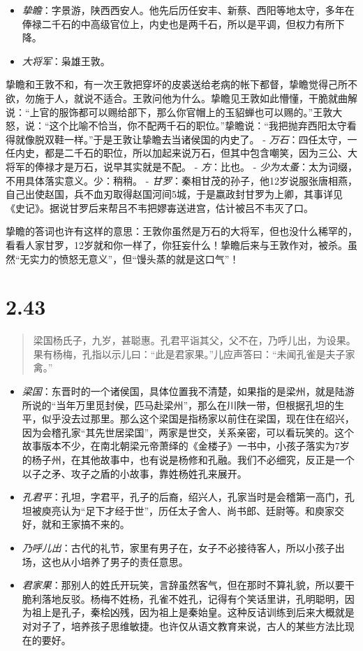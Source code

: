 \documentclass[]{book}
\providecommand{\tightlist}{%
  \setlength{\itemsep}{0pt}\setlength{\parskip}{0pt}}
\begin{document}
\begin{itemize}
\tightlist
\item
  \emph{挚瞻}：字景游，陕西西安人。他先后历任安丰、新蔡、西阳等地太守，多年在俸禄二千石的中高级官位上，内史也是两千石，所以是平调，但权力有所下降。
\item
  \emph{大将军}：枭雄王敦。
\end{itemize}

挚瞻和王敦不和，有一次王敦把穿坏的皮裘送给老病的帐下都督，挚瞻觉得己所不欲，勿施于人，就说不适合。王敦问他为什么。挚瞻见王敦如此懵懂，干脆就曲解说：``上官的服饰都可以赐给部下，那么你官帽上的玉貂蝉也可以赐的。''王敦大怒，说：``这个比喻不恰当，你不配两千石的职位。''挚瞻说：``我把抛弃西阳太守看得就像脱双鞋一样。''于是王敦让挚瞻去当诸侯国的内史了。
-
\emph{万石}：四任太守，一任内史，都是二千石的职位，所以加起来说万石，但其中包含嘲笑，因为三公、大将军的俸禄才是万石，说早其实就是不配。
- \emph{方}：比也。 -
\emph{少为太蚤}：太为词缀，不用具体落实意义。少：稍稍。 -
\emph{甘罗}：秦相甘茂的孙子，他12岁说服张唐相燕，自己出使赵国，兵不血刃取得赵国河间5城，于是嬴政封甘罗为上卿，其事详见《史记》。据说甘罗后来帮吕不韦把嫪毐送进宫，估计被吕不韦灭了口。

挚瞻的答词也许有这样的意思：王敦你虽然是万石的大将军，但也没什么稀罕的，看看人家甘罗，12岁就和你一样了，你狂妄什么！挚瞻后来与王敦作对，被杀。虽然``无实力的愤怒无意义''，但``馒头蒸的就是这口气''！

\section{2.43}\label{section-89}

\begin{quote}
梁国杨氏子，九岁，甚聪惠。孔君平诣其父，父不在，乃呼儿出，为设果。果有杨梅，孔指以示儿曰：``此是君家果。''儿应声答曰：``未闻孔雀是夫子家禽。''
\end{quote}

\begin{itemize}
\tightlist
\item
  \emph{梁国}：东晋时的一个诸侯国，具体位置我不清楚，如果指的是梁州，就是陆游所说的``当年万里觅封侯，匹马赴梁州''，那么在川陕一带，但根据孔坦的生平，似乎没去过那里。那么这个梁国是指杨家以前住在梁国，现在住在绍兴，因为会稽孔家``其先世居梁国''，两家是世交，关系亲密，可以看玩笑的。这个故事版本不少，在南北朝梁元帝萧绎的《金楼子》一书中，小孩子落实为7岁的杨子州，在其他故事中，也有说是杨修和孔融。我们不必细究，反正是一个以子之矛、攻子之盾的小故事，靠姓杨姓孔来展开。
\item
  \emph{孔君平}：孔坦，字君平，孔子的后裔，绍兴人，孔家当时是会稽第一高门，孔坦被庾亮认为``足下才经于世''，历任太子舍人、尚书郎、廷尉等。和庾家交好，就和王家搞不来的。
\item
  \emph{乃呼儿出}：古代的礼节，家里有男子在，女子不必接待客人，所以小孩子出场，这也从小培养了男子的责任意思。
\item
  \emph{君家果}：那别人的姓氏开玩笑，言辞虽然客气，但在那时不算礼貌，所以要干脆利落地反驳。杨梅不姓杨，孔雀不姓孔，记得有个笑话里讲，孔明聪明，因为祖上是孔子，秦桧凶残，因为祖上是秦始皇。这种反诘训练到后来大概就是对对子了，培养孩子思维敏捷。也许仅从语文教育来说，古人的某些方法比现在的要好。
\end{itemize}
\end{document}
